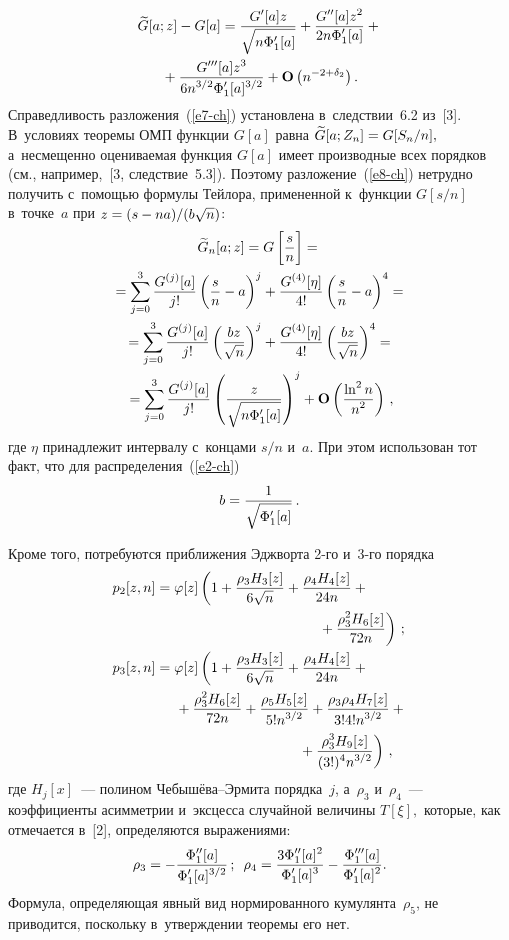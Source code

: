 \begin{multicols}{2}
\noindent
\begin{multline}
 \widetilde{G}[a;z]-G[a]=
 \displaystyle\frac{\displaystyle G'[a] z\mathstrut}{\displaystyle \sqrt{n\Phi'_1[a]}\mathstrut}
 + \displaystyle\frac{\displaystyle G''[a] z^2\mathstrut}{\displaystyle 2 n\Phi'_1[a]\mathstrut}+{}\\
{} + \displaystyle\frac{\displaystyle G'''[a] z^3\mathstrut}{\displaystyle 6 n^{3/2}\Phi'_1[a]^{3/2}\mathstrut}
 + \mathbf{O}\left(n^{ -2+\delta_2}\right).
 \label{e8-ch}
 \end{multline}
 Справедливость разложения~(\ref{e7-ch}) установлена в~следствии~6.2 из~[3].
 В~условиях теоремы ОМП функции $G[a]$ равна $\widetilde{G}[a;Z_n]\hm=G[S_n/n],$
 а~несмещенно оцениваемая функция $G[a]$ имеет производные всех порядков 
 (см., например,~[3, следствие~5.3]). Поэтому разложение~(\ref{e8-ch}) 
 нетрудно получить с~по\-мощью формулы Тейлора, примененной к~функции $G[s/n]$ в~точке~$a$ 
 при $z\hm=(s\hm-na)/(b\sqrt{n})$:
 \begin{multline*}
 \widetilde{G}_n[a;z]=G\left[\displaystyle\frac{\displaystyle s\mathstrut}{\displaystyle n\mathstrut}\right]
  ={}\\
  {}=\sum\limits_{j=0}^3 \displaystyle\frac{\displaystyle G^{(j)}[a]\mathstrut}{\displaystyle j!\mathstrut}\left(\displaystyle\frac{\displaystyle s\mathstrut}{\displaystyle n\mathstrut}-a\right)^j+
   \displaystyle\frac{\displaystyle G^{(4)}[\eta]\mathstrut}{\displaystyle 4!\mathstrut}\left(\displaystyle\frac{\displaystyle s\mathstrut}{\displaystyle n\mathstrut}-a\right)^4={}\\
{}=\sum\limits_{j=0}^3 \displaystyle\frac{\displaystyle G^{(j)}[a]\mathstrut}{\displaystyle j!\mathstrut}\left(\displaystyle\frac{\displaystyle b z\mathstrut}{\displaystyle \sqrt{n}\mathstrut}\right)^j+
   \displaystyle\frac{\displaystyle G^{(4)}[\eta]\mathstrut}{\displaystyle 4!\mathstrut}\left(\displaystyle\frac{\displaystyle b z\mathstrut}{\displaystyle \sqrt{n}\mathstrut}\right)^4={}
\\
  {}=\sum\limits_{j=0}^3 \displaystyle\frac{\displaystyle G^{(j)}[a]\mathstrut}{\displaystyle j!\mathstrut}
  \left(\displaystyle\frac{\displaystyle z\mathstrut}{\displaystyle \sqrt{n \Phi'_1[a]}\mathstrut}\right)^j+
   {\bf O}\left(\displaystyle\frac{\displaystyle \ln^2 n\mathstrut}{\displaystyle n^2\mathstrut}\right)\,,
 \end{multline*}
 где $\eta$ принадлежит интервалу с~концами $s/n$ и~$a$. 
 При этом использован тот факт, что для распределения~(\ref{e2-ch})
 $$
 b=\displaystyle\frac{\displaystyle 1\mathstrut}{\displaystyle \sqrt{\Phi'_1[a]}\mathstrut}\,.
 $$

 Кроме того, потребуются приближения Эдж\-вор\-та 2-го и~3-го порядка
  \begin{align}
 p_2[z,n]&=\varphi[z]\left( 1 + \fr{\rho_3 H_3[z]}{ 6\sqrt {n }} +
 \fr{\rho_4 H_4[z]}{24n} +{}\right.\notag\\
 &\hspace*{40mm}\left.{}+ \fr{\rho_3^2 H_6[z]}{72n} \right)\,;
 \label{e9-ch}\\
 p_3[z,n]&=\varphi[z]\left( 1 + \fr{\rho_3 H_3[z]}{ 6\sqrt {n }} +
 \fr{\rho_4 H_4[z]}{24n} +{}\right.\notag\\
  &\hspace*{5mm}
{} + \fr{\rho_3^2 H_6[z]}{72n}+\fr{\rho_5 H_5[z]}{5! n^{3/2}}
 +\fr{\rho_3 \rho_4 H_7[z]}{3!4! n^{3/2}}+{}\notag\\
&\hspace*{35mm} \left.{}+ \fr{\rho_3^3 H_9[z]}{(3!)^4 n^{3/2}}
 \right)\,,\!
 \label{e10-ch}
 \end{align}
 где $H_j[x]$~--- полином Че\-бы\-шё\-ва--Эр\-ми\-та порядка~$j$, 
 а~$\rho_3$ и~$\rho_4$~--- коэффициенты асимметрии и~эксцесса случайной 
 величины $T[\xi],$ которые, как отмечается в~[2], определяются выражениями:
 \begin{equation}
 \rho_3  =  - \displaystyle\frac{\displaystyle \Phi''_1 [a]\mathstrut}{\displaystyle \Phi'_1[a]^{3/2}\mathstrut}\,;\enskip
 \rho_4  = \displaystyle\frac{\displaystyle 3 \Phi''_1[a]^2 \mathstrut}{\displaystyle \Phi'_1[a]^3\mathstrut}
 - \displaystyle\frac{\displaystyle \Phi'''_1[a]\mathstrut}{\displaystyle \Phi'_1[a]^2 \mathstrut}.
 \label{e11-ch}
 \end{equation}
 Формула, определяющая явный вид нормированного кумулянта~$\rho_5$, не приводится,
 поскольку в~утверждении теоремы его нет.


\end{multicols}
